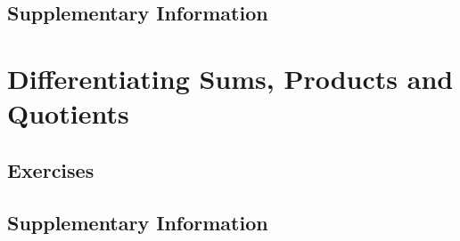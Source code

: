 \documentclass{fts_m2}
\begin{document}
    \subsection*{Supplementary Information}
    

    \section{Differentiating Sums, Products and Quotients}
    
    \subsection*{Exercises}
    
    \subsection*{Supplementary Information}
    

\end{document}
